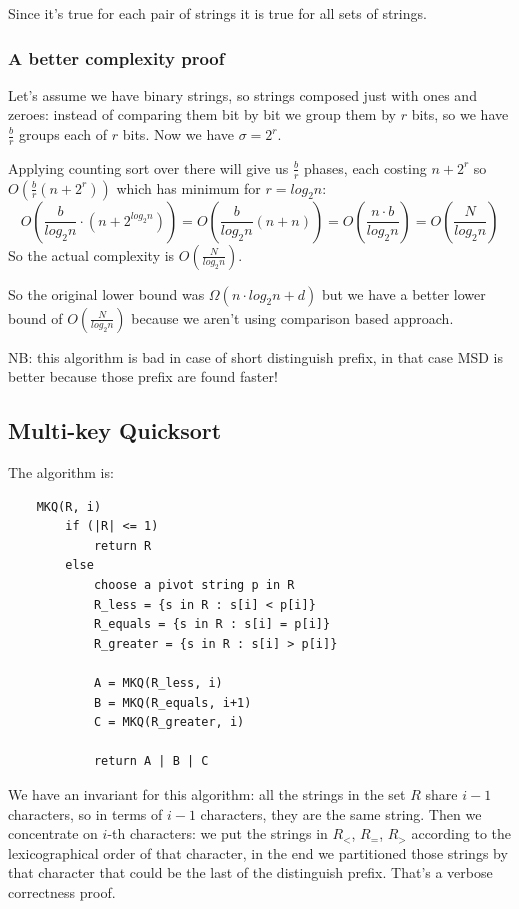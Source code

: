 Since it's true for each pair of strings it is true for all sets of strings.

\subsubsection{A better complexity proof}
Let's assume we have binary strings, so strings composed just with ones and zeroes: instead of comparing them bit by bit we group them by $r$ bits, so we have $\frac{b}{r}$ groups each of $r$ bits.
Now we have $\sigma = 2^r$.

Applying counting sort over there will give us $\frac{b}{r}$ phases, each costing $n + 2^r$ so $O\left( \frac{b}{r}(n+2^r) \right)$ which has minimum for $r = log_2 n$:
$$
    O\left( \frac{b}{log_2 n} \cdot (n + 2^{log_2 n}) \right) = O\left( \frac{b}{log_2 n} (n+n) \right) = O\left( \frac{n \cdot b}{log_2 n} \right) = O\left( \frac{N}{log_2 n} \right)
$$
So the actual complexity is $O\left( \frac{N}{log_2 n} \right)$.

So the original lower bound was $\Omega(n \cdot log_2 n + d)$ but we have a better lower bound of $O\left( \frac{N}{log_2 n} \right)$ because we aren't using comparison based approach.

NB: this algorithm is bad in case of short distinguish prefix, in that case MSD is better because those prefix are found faster!

\subsection{Multi-key Quicksort}
The algorithm is:
\begin{verbatim}
    MKQ(R, i)
        if (|R| <= 1)
            return R
        else
            choose a pivot string p in R
            R_less = {s in R : s[i] < p[i]}
            R_equals = {s in R : s[i] = p[i]}
            R_greater = {s in R : s[i] > p[i]}

            A = MKQ(R_less, i)
            B = MKQ(R_equals, i+1)
            C = MKQ(R_greater, i)

            return A | B | C
\end{verbatim}

We have an invariant for this algorithm: all the strings in the set $R$ share $i-1$ characters, so in terms of $i-1$ characters, they are the same string.
Then we concentrate on $i$-th characters: we put the strings in $R_<$, $R_=$, $R_>$ according to the lexicographical order of that character, in the end we partitioned those strings by that character that could be the last of the distinguish prefix.
That's a verbose correctness proof.


